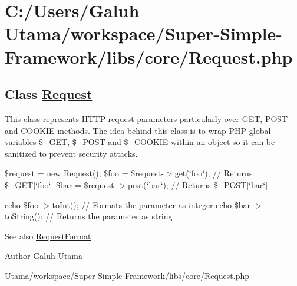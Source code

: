 \hypertarget{_c_1_2_users_2_galuh_01_utama_2workspace_2_super-_simple-_framework_2libs_2core_2_request_8php-example}{\section{\-C\-:/\-Users/\-Galuh Utama/workspace/\-Super-\/\-Simple-\/\-Framework/libs/core/\-Request.\-php}
}
\subsection*{\-Class \hyperlink{class_request}{\-Request}}

\-This class represents \-H\-T\-T\-P request parameters particularly over \-G\-E\-T, \-P\-O\-S\-T and \-C\-O\-O\-K\-I\-E methods. \-The idea behind this class is to wrap \-P\-H\-P global variables \$\-\_\-\-G\-E\-T, \$\-\_\-\-P\-O\-S\-T and \$\-\_\-\-C\-O\-O\-K\-I\-E within an object so it can be sanitized to prevent security attacks. 

{\ttfamily  \$request = new \-Request(); \$foo = \$request-\/$>$get(\char`\"{}foo\char`\"{}); // \-Returns \$\-\_\-\-G\-E\-T\mbox{[}\char`\"{}foo\char`\"{}\mbox{]} \$bar = \$request-\/$>$post(\char`\"{}bar\char`\"{}); // \-Returns \$\-\_\-\-P\-O\-S\-T\mbox{[}\char`\"{}bar\char`\"{}\mbox{]}}

{\ttfamily  echo \$foo-\/$>$to\-Int(); // \-Formats the parameter as integer echo \$bar-\/$>$to\-String(); // \-Returns the parameter as string }

\begin{DoxySeeAlso}{\-See also}
\hyperlink{class_request_format}{\-Request\-Format}
\end{DoxySeeAlso}
\begin{DoxyAuthor}{\-Author}
\-Galuh \-Utama
\end{DoxyAuthor}

\begin{DoxyCodeInclude}
\end{DoxyCodeInclude}
 \hyperlink{_request_8php_source}{\-Utama/workspace/\-Super-\/\-Simple-\/\-Framework/libs/core/\-Request.\-php} 
